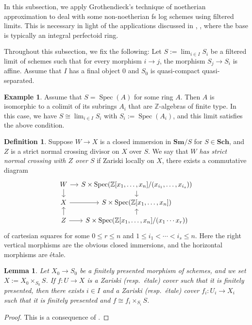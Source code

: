 \documentclass[11pt, a4paper]{amsart}
\newtheorem{lem}[thm]{Lemma}
\theoremstyle{definition}
\newtheorem{df}[thm]{Definition}
\newtheorem{exm}[thm]{Example}
\numberwithin{equation}{subsection}
\newcommand{\Z}{\mathbb{Z}}
\newcommand{\Sch}{\mathbf{Sch}}
\newcommand{\Sm}{\mathbf{Sm}}
\providecommand{\Spec}[1]{\operatorname{Spec}(#1)} 	%
\renewcommand{\lim}{\operatorname{lim}}			 %
\begin{document}
In this subsection,
we apply Grothendieck's technique \cite[\S IV.8]{EGA} of noetherian approximation to deal with some non-noetherian fs log schemes using filtered limits. This is necessary in light of the applications discussed in \cite{BLMP}, \cite{BLPO2}, where the base is typically an integral perfectoid ring. 

Throughout this subsection,
we fix the following:
Let $S:=\lim_{i\in I} S_i$ be a filtered limit of schemes such that for every morphism $i\to j$,
the morphism $S_j\to S_i$ is affine.
Assume that $I$ has a final object $0$ and $S_0$ is quasi-compact quasi-separated.

\begin{exm}
Assume that $S=\Spec{A}$ for some ring $A$.
Then $A$ is isomorphic to a colimit of its subrings $A_i$ that are $\Z$-algebras of finite type.
In this case,
we have $S\cong \lim_{i\in I} S_i$ with $S_i:=\Spec{A_i}$,
and this limit satisfies the above condition.
\end{exm}



\begin{df}
\label{ProplogSH.1}
Suppose $W\to X$ is a closed immersion in $\Sm/S$ for $S\in \Sch$, 
and $Z$ is a strict normal crossing divisor on $X$ over $S$.
We say that \emph{$W$ has strict normal crossing with $Z$ over $S$} 
if Zariski locally on $X$, there exists a commutative diagram
\begin{equation}
\label{ProplogSH.1.1}
\begin{tikzcd}[column sep=small, row sep=small]
W\ar[d]\ar[r]&
S\times \Spec{\Z[x_1,\ldots,x_n]/(x_{i_1},\ldots, x_{i_s})}\ar[d]
\\
X\ar[d,leftarrow]\ar[r]&
S\times \Spec{\Z[x_1,\ldots,x_n]}\ar[d,leftarrow]
\\
Z\ar[r]&
S\times \Spec{\Z[x_1,\ldots,x_n]/(x_1\cdots x_r)}
\end{tikzcd}
\end{equation}
of cartesian squares for some $0\leq r\leq n$ and $1\leq i_1<\cdots<i_s\leq n$. 
Here the right vertical morphisms are the obvious closed immersions, 
and the horizontal morphisms are \'etale.
\end{df}

\begin{lem}
\label{noetherian.5}
Let $X_0\to S_0$ be a finitely presented morphism of schemes, and we set $X:=X_0\times_{S_0} S$.
If $f\colon U\to X$ is a Zariski (resp.\ \'etale) cover such that it is finitely presented,
then there exists $i\in I$ and a Zariski (resp.\ \'etale) cover $f_i\colon U_i\to X_i$ such that it is finitely presented and $f\cong f_i\times_{S_i} S$.
\end{lem}
\begin{proof}
This is a consequence of \cite[Th\'eor\`emes IV.8.8.2, IV.8.10.5(iii),(iv), Proposition IV.17.7.8]{EGA}.
\end{proof}
\end{document}
